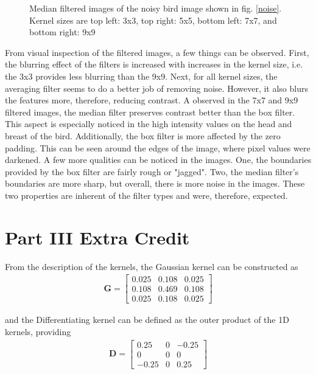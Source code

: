 \documentclass{article}[12 pt]
\begin{document}
\begin{figure}[h!]
\captionsetup[subfloat]{labelformat=empty}
\centering
{}
\hspace{0mm}
\caption{Median filtered images of the noisy bird image shown in fig. \ref{noise}.  Kernel sizes are top left: 3x3, top right: 5x5, bottom left: 7x7, and bottom right: 9x9}
\label{median}
\end{figure}

\noindent
From visual inspection of the filtered images, a few things can be observed.  First, the blurring effect of the filters is increased with increases in the kernel size, i.e. the 3x3 provides less blurring than the 9x9.  Next, for all kernel sizes, the averaging filter seems to do a better job of removing noise.  However, it also blurs the features more, therefore, reducing contrast.  A observed in the 7x7 and 9x9 filtered images, the median filter preserves contrast better than the box filter.  This aspect is especially noticed in the high intensity values on the head and breast of the bird. Additionally, the box filter is more affected by the zero padding.  This can be seen around the edges of the image, where pixel values were darkened.  A few more qualities can be noticed in the images.  One, the boundaries provided by the box filter are fairly rough or "jagged".  Two, the median filter's boundaries are more sharp, but overall, there is more noise in the images.  These two properties are inherent of the filter types and were, therefore, expected.

\section*{Part III Extra Credit}


\noindent
From the description of the kernels, the Gaussian kernel can be constructed as 
\begin{align*}
\bm{G} = 
\begin{bmatrix}
    0.025 & 0.108 & 0.025 \\
    0.108 & 0.469 & 0.108 \\
    0.025 & 0.108 & 0.025     
\end{bmatrix}
\end{align*}

and the Differentiating kernel can be defined as the outer product of the 1D kernels, providing 
\begin{align*}
\bm{D} = 
\begin{bmatrix}
    0.25 & 0 & -0.25 \\
    0 & 0 & 0 \\
    -0.25 & 0 & 0.25
\end{bmatrix}
\end{align*}
\end{document}
